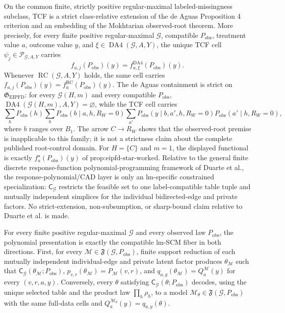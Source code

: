 On the common finite, strictly positive regular-maximal labeled-missingness subclass, TCF is a strict class-relative extension of the de Aguas Proposition 4 criterion and an embedding of the Mokhtarian observed-root theorem. More precisely, for every finite positive regular-maximal \(\mathcal G\), compatible \(P_{\mathrm{obs}}\), treatment value \(a\), outcome value \(y\), and \(\xi\in\operatorname{DA4}(\mathcal G,A,Y)\), the unique TCF cell \(\psi_j\in\mathscr P_{\mathcal G,A,Y}\) carries \[f_{a,j}(P_{\mathrm{obs}})(y)=f^{\mathrm{DA4}}_{a,\xi}(P_{\mathrm{obs}})(y).\] Whenever \(\operatorname{RC}(\mathcal G,A,Y)\) holds, the same cell carries \(f_{a,j}(P_{\mathrm{obs}})(y)=f_a^{\mathrm{RC}}(P_{\mathrm{obs}})(y)\). The de Aguas containment is strict on \(\mathfrak G_{\mathrm{EIPFD}}\): for every \(\mathcal G(H,m)\) and every compatible \(P_{\mathrm{obs}}\), \(\operatorname{DA4}(\mathcal G(H,m),A,Y)=\varnothing\), while the TCF cell carries \[\sum_hP_{\mathrm{obs}}(h)\sum_bP_{\mathrm{obs}}(b\mid a,h,R_W=0)\sum_{a'}P_{\mathrm{obs}}(y\mid b,a',h,R_W=0)P_{\mathrm{obs}}(a'\mid h,R_W=0),\] where \(b\) ranges over \(B_1\). The arrow \(C\to R_W\) shows that the observed-root premise is inapplicable to this family; it is not a strictness claim about the complete published root-control domain. For \(H=\{C\}\) and \(m=1\), the displayed functional is exactly \(f_a^\star(P_{\mathrm{obs}})(y)\) of \(\text{prop:eipfd-star-worked}\). Relative to the general finite discrete response-function polynomial-programming framework of Duarte et al., the response-polynomial/CAD layer is only an lm-specific constrained specialization: \(\mathsf C_{\mathcal G}\) restricts the feasible set to one label-compatible table tuple and mutually independent simplices for the individual bidirected-edge and private factors. No strict-extension, non-subsumption, or sharp-bound claim relative to Duarte et al. is made.

For every finite positive regular-maximal \(\mathcal G\) and every observed law \(P_{\mathrm{obs}}\), the polynomial presentation is exactly the compatible lm-SCM fiber in both directions. First, for every \(\mathcal M\in\mathfrak F(\mathcal G,P_{\mathrm{obs}})\), finite support reduction of each mutually independent individual-edge and private latent factor produces \(\theta_{\mathcal M}\) such that \(\mathsf C_{\mathcal G}(\theta_{\mathcal M};P_{\mathrm{obs}})\), \(p_{v,r}(\theta_{\mathcal M})=P_{\mathcal M}(v,r)\), and \(q_{a,y}(\theta_{\mathcal M})=Q_a^{\mathcal M}(y)\) for every \((v,r,a,y)\). Conversely, every \(\theta\) satisfying \(\mathsf C_{\mathcal G}(\theta;P_{\mathrm{obs}})\) decodes, using the unique selected table and the product law \(\prod_h\rho_h\), to a model \(\mathcal M_{\theta}\in\mathfrak F(\mathcal G,P_{\mathrm{obs}})\) with the same full-data cells and \(Q_a^{\mathcal M_{\theta}}(y)=q_{a,y}(\theta)\).

